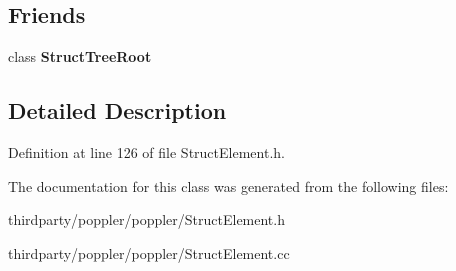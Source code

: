 \subsection*{Friends}
\begin{DoxyCompactItemize}
\item 
\mbox{\label{class_struct_element_a112cde3e1246dc716205724dfa77c117}} 
class {\bfseries Struct\+Tree\+Root}
\end{DoxyCompactItemize}


\subsection{Detailed Description}


Definition at line 126 of file Struct\+Element.\+h.



The documentation for this class was generated from the following files\+:\begin{DoxyCompactItemize}
\item 
thirdparty/poppler/poppler/Struct\+Element.\+h\item 
thirdparty/poppler/poppler/Struct\+Element.\+cc\end{DoxyCompactItemize}

